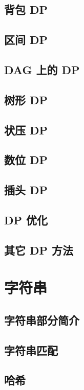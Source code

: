 \section{背包 DP}

\section{区间 DP}

\section{DAG 上的 DP}

\section{树形 DP}

\section{状压 DP}

\section{数位 DP}

\section{插头 DP}

\section{DP 优化}

\section{其它 DP 方法}

\chapter{字符串}
\section{字符串部分简介}


\section{字符串匹配}

\section{哈希}

